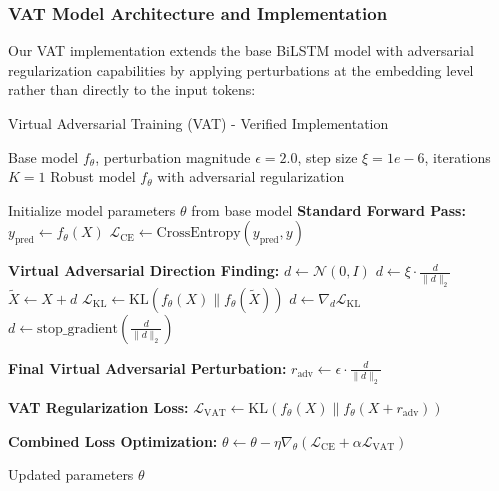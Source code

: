 \documentclass[../main.tex]{subfiles}
\begin{document}
\subsubsection{VAT Model Architecture and Implementation}

Our VAT implementation extends the base BiLSTM model with adversarial regularization capabilities by applying perturbations at the embedding level rather than directly to the input tokens:

\begin{breakablealgorithm}{Virtual Adversarial Training (VAT) - Verified Implementation}
\begin{algorithmic}[1]
\Require Base model $f_\theta$, perturbation magnitude $\epsilon=2.0$, step size $\xi=1e-6$, iterations $K=1$ 
\Ensure Robust model $f_\theta$ with adversarial regularization

\State Initialize model parameters $\theta$ from base model
    \State \textbf{Standard Forward Pass:}
    \State $y_{\text{pred}} \gets f_\theta(X)$ 
    \State $\mathcal{L}_{\text{CE}} \gets \text{CrossEntropy}(y_{\text{pred}}, y)$ 
    
    \State \textbf{Virtual Adversarial Direction Finding:} 
    \State $d \gets \mathcal{N}(0, I)$ 
     
        \State $d \gets \xi \cdot \frac{d}{\|d\|_2}$ 
        \State $\tilde{X} \gets X + d$ 
        \State $\mathcal{L}_{\text{KL}} \gets \text{KL}(f_\theta(X) \| f_\theta(\tilde{X}))$ 
        \State $d \gets \nabla_d \mathcal{L}_{\text{KL}}$ 
        \State $d \gets \text{stop\_gradient}(\frac{d}{\|d\|_2})$ 
    \EndFor
    
    \State \textbf{Final Virtual Adversarial Perturbation:}
    \State $r_{\text{adv}} \gets \epsilon \cdot \frac{d}{\|d\|_2}$ 
    
    \State \textbf{VAT Regularization Loss:}
    \State $\mathcal{L}_{\text{VAT}} \gets \text{KL}(f_\theta(X) \| f_\theta(X + r_{\text{adv}}))$ 
    
    \State \textbf{Combined Loss Optimization:}
    \State $\theta \gets \theta - \eta \nabla_\theta (\mathcal{L}_{\text{CE}} + \alpha \mathcal{L}_{\text{VAT}})$ 
    
    \State \Return Updated parameters $\theta$
\EndFunction
\end{algorithmic}
\end{breakablealgorithm}
\end{document}
